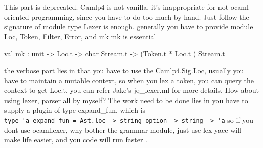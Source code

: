   This part is deprecated. Camlp4 is not vanilla, it's inappropriate
  for not ocaml-oriented programming, since you have to do too much by
  hand.  Just follow the signature of module type Lexer is enough.
  generally you have to provide module Loc, Token, Filter, Error, and
  mk mk is essential

  \begin{ocamlcode}
val mk : unit -> Loc.t -> char Stream.t -> (Token.t * Loc.t ) Stream.t     
  \end{ocamlcode}

  the verbose part lies in that you have to use the Camlp4.Sig.Loc,
  usually you have to maintain a mutable context, so when you lex a
  token, you can query the context to get Loc.t. you can refer Jake's jq\_lexer.ml
  for more details. How about using lexer, parser all by myself?
  The work need to be done lies in you have to supply a plugin of type
  expand\_fun, which is \\
  \verb|type 'a expand_fun = Ast.loc -> string option -> string -> 'a|
  so if you dont use ocamllexer, why bother the grammar module, just
  use lex yacc will make life easier, and you code will run faster . 

